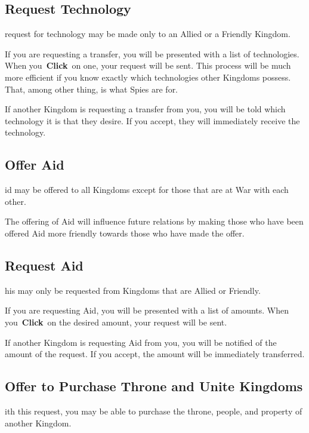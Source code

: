 \subsection{Request Technology}

 request for technology may be made only to an Allied or a Friendly Kingdom.

If you are requesting a transfer, you will be presented with a list of technologies. When you \textbf{Click} on one, your request will be sent. This process will be much more efficient if you know exactly which technologies other Kingdoms possess. That, among other thing, is what Spies are for.

If another Kingdom is requesting a transfer from you, you will be told which technology it is that they desire. If you accept, they will immediately receive the technology.

\subsection{Offer Aid}

id may be offered to all Kingdoms except for those that are at War with each other.

The offering  of Aid will influence future relations by making those who have been offered Aid more friendly towards those who have made the offer.

\subsection{Request Aid}

his may only be requested from Kingdoms that are Allied or Friendly.

If you are requesting  Aid, you will be presented with a list of amounts. When you \textbf{Click} on the desired amount, your request will be sent.

If another Kingdom is requesting Aid from you, you will be notified of the amount of the request. If you accept, the amount will be immediately transferred.

\subsection{Offer to Purchase Throne and Unite Kingdoms}

ith this request, you may be able to purchase the throne, people, and property of another Kingdom.


